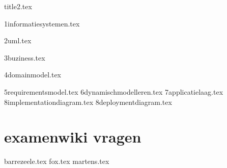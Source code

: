 \documentclass[a4paper,11pt]{article}
\begin{document}


{title2.tex}

\clearpage

\thispagestyle{empty}

\tableofcontents

\clearpage




{1informatiesystemen.tex}

{2uml.tex}

{3buziness.tex}

{4domainmodel.tex}

{5requirementsmodel.tex}
{6dynamischmodelleren.tex}
{7applicatielaag.tex}
{8implementationdiagram.tex}
{8deploymentdiagram.tex}

\section{examenwiki vragen}
{barrezeele.tex}
{fox.tex}
{martens.tex}





\clearpage

\printglossary[title=Termen,toctitle=Lijst van termen]

\printglossary[type=\acronymtype]


\clearpage
\printsolutions
\end{document}
